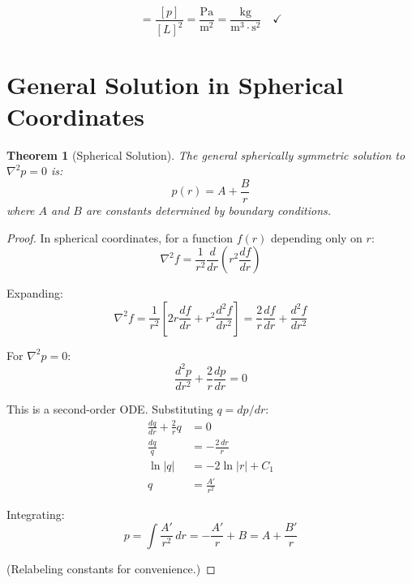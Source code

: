 \documentclass[12pt,a4paper,openany]{book}
\theoremstyle{definition}
\theoremstyle{plain}
\newtheorem{theorem}{Theorem}[chapter]
\theoremstyle{remark}
\begin{document}
\begin{dimcheckbox}
\begin{equation}
[\nabla^2 p] = \frac{[p]}{[L]^2} = \frac{\text{Pa}}{\text{m}^2} = \frac{\text{kg}}{\text{m}^3 \cdot \text{s}^2} \quad \checkmark
\end{equation}
\end{dimcheckbox}

\section{General Solution in Spherical Coordinates}

\begin{theorem}[Spherical Solution]
The general spherically symmetric solution to $\nabla^2 p = 0$ is:
\begin{equation}
p(r) = A + \frac{B}{r}
\label{eq:general_p}
\end{equation}
where $A$ and $B$ are constants determined by boundary conditions.
\end{theorem}

\begin{proof}
In spherical coordinates, for a function $f(r)$ depending only on $r$:
\begin{equation}
\nabla^2 f = \frac{1}{r^2}\frac{d}{dr}\left(r^2 \frac{df}{dr}\right)
\label{eq:laplacian_spherical}
\end{equation}

Expanding:
\begin{equation}
\nabla^2 f = \frac{1}{r^2}\left[2r\frac{df}{dr} + r^2\frac{d^2f}{dr^2}\right] = \frac{2}{r}\frac{df}{dr} + \frac{d^2f}{dr^2}
\label{eq:laplacian_expanded}
\end{equation}

For $\nabla^2 p = 0$:
\begin{equation}
\frac{d^2p}{dr^2} + \frac{2}{r}\frac{dp}{dr} = 0
\label{eq:ode_p}
\end{equation}

This is a second-order ODE. Substituting $q = dp/dr$:
\begin{align}
\frac{dq}{dr} + \frac{2}{r}q &= 0 \\
\frac{dq}{q} &= -\frac{2\,dr}{r} \\
\ln|q| &= -2\ln|r| + C_1 \\
q &= \frac{A'}{r^2}
\label{eq:q_solution}
\end{align}

Integrating:
\begin{equation}
p = \int \frac{A'}{r^2}\,dr = -\frac{A'}{r} + B = A + \frac{B'}{r}
\label{eq:p_general}
\end{equation}

(Relabeling constants for convenience.)
\end{proof}
\end{document}
